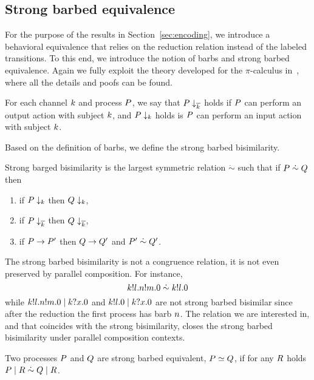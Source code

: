 \subsection{Strong barbed equivalence}\label{sec:strong_barbed_equivalence}
For the purpose of the results in Section~\ref{sec:encoding}, we introduce a behavioral equivalence that relies on the reduction relation instead of the labeled transitions. To this end, we introduce the notion of barbs and strong barbed equivalence. Again we fully exploit the theory developed for the $\pi$-calculus in~\cite{pi_calculus}, where all the details and poofs can be found.  

\begin{definition}[Barbs]
For each channel $k$ and process $P$, we say that $P\downarrow_{\overline{k}}$ holds if $P$ can perform an output action with subject $k$, and $P\downarrow_k$ holds is $P$ can perform an input action with subject $k$.
\end{definition}

Based on the definition of barbs, we define the strong barbed bisimilarity.

\begin{definition}
Strong barged bisimilarity is the largest symmetric relation $\dot\sim$ such that if $P\;\dot\sim\;Q$ then 
\begin{enumerate}
\item if $P\downarrow_k$ then $Q\downarrow_k$,
\item if $P\downarrow_{\overline{k}}$ then $Q\downarrow_{\overline{k}}$,
\item if $P\rightarrow P'$ then $Q\rightarrow Q'$ and $P'\;\dot\sim\;Q'$.
\end{enumerate}
\end{definition}

The strong barbed  bisimilarity is not a congruence relation, it is not even preserved by parallel composition. For instance, 
\[k!l.n!m.0 \;\dot\sim\; k!l.0
\] 
while 
$k!l.n!m.0 \;|\; k?x.0$ and  $k!l.0 \;|\; k?x.0$ are not strong barbed bisimilar since after the reduction the first process has barb $n$. The relation we are interested in, and that coincides with the strong bisimilarity, closes the strong barbed bisimilarity under parallel composition contexts.
\begin{definition}
Two processes $P$ and $Q$ are strong barbed equivalent, $P\simeq Q$, if for any $R$ holds $P\;|\;R\;\dot\sim\;Q\;|\;R$. 
\end{definition}

